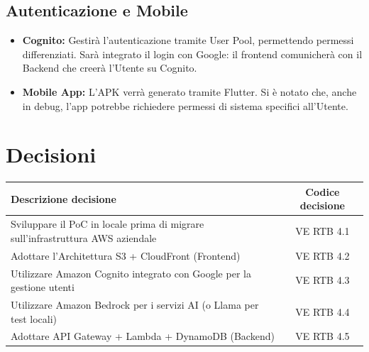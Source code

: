 \documentclass[a4paper,12pt]{article}
\newcommand{\ignoreglossary}{}
\begin{document}
\subsection{Autenticazione e Mobile}
\begin{itemize}
    \item \textbf{Cognito:} Gestirà l'autenticazione tramite User Pool, permettendo permessi differenziati. Sarà integrato il login con Google: il frontend comunicherà con il Backend che creerà l'Utente su Cognito.
    \item \textbf{Mobile App:} L'APK verrà generato tramite Flutter. Si è notato che, anche in debug, l'app potrebbe richiedere permessi di sistema specifici all'Utente.
\end{itemize}

\section{Decisioni}
\begin{center}
\small
\renewcommand{\arraystretch}{1.2} 
\begin{tabular}{|p{}|c|}
\hline
\rowcolor{gray!60} 
\textbf{Descrizione decisione} & \textbf{Codice decisione} \\
\hline
\rowcolor{white}
Sviluppare il PoC in locale prima di migrare sull'infrastruttura AWS aziendale & VE \ignoreglossary{RTB} 4.1 \\
\hline
\rowcolor{gray!20}
Adottare l'Architettura S3 + CloudFront (Frontend) &  VE \ignoreglossary{RTB} 4.2 \\
\hline
\rowcolor{white}
Utilizzare Amazon Cognito integrato con Google per la gestione utenti &  VE \ignoreglossary{RTB} 4.3 \\
\hline
\rowcolor{gray!20}
Utilizzare Amazon Bedrock per i servizi AI (o Llama per test locali) & VE \ignoreglossary{RTB} 4.4 \\
\hline
\rowcolor{white}
Adottare API Gateway + Lambda + DynamoDB (Backend) &  VE \ignoreglossary{RTB} 4.5 \\
\hline
\end{tabular}
\end{center}

\end{document}
